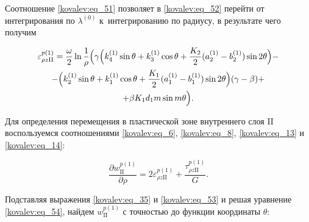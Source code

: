 Соотношение \eqref{kovalev:eq_51} позволяет в \eqref{kovalev:eq_52} перейти от интегрирования по $\lambda^{(0)}$  к~интегрированию по радиусу, в результате чего получим

 \begin{multline}

\label{kovalev:eq_53}

\varepsilon_{\rho z\mathrm{II}}^{p(1)}=

\frac{\omega}{2}\ln\frac1{\rho}

\Bigl(\gamma\Bigl(k_4^{(1)}\sin\theta+k_3^{(1)}\cos\theta+\frac{K_2}{2}

(a_2^{(1)}-b_2^{(1)})\sin2\theta\Bigr) -

\\

-\Bigl( k_2^{(1)}\sin\theta+k_1^{(1)}\cos\theta+\frac{K_1}{2}

  (a_1^{(1)}- b_1^{(1)})\sin2\theta\Bigr)

  (\gamma-\beta)+ \\ +

  \beta K_1d_1m\sin m\theta \Bigr).

 \end{multline}



Для определения перемещения в пластической зоне внутреннего слоя II воспользуемся соотношениями \eqref{kovalev:eq_6}, \eqref{kovalev:eq_8}, \eqref{kovalev:eq_13} и \eqref{kovalev:eq_14}:

 \begin{equation}

\label{kovalev:eq_54}

  \frac{\partial w_{\mathrm{II}}^{p(1)}}{\partial\rho}=2\varepsilon_{\rho z\mathrm{II}}^{p(1)}+\frac{\tau_{\rho z\mathrm{II}}^{p(1)}}{G}.

 \end{equation}



Подставляя выражения \eqref{kovalev:eq_35} и \eqref{kovalev:eq_53} и решая уравнение \eqref{kovalev:eq_54}, найдем  $w_{\mathrm{II}}^{p(1)}$ с точностью до функции координаты $\theta$:

